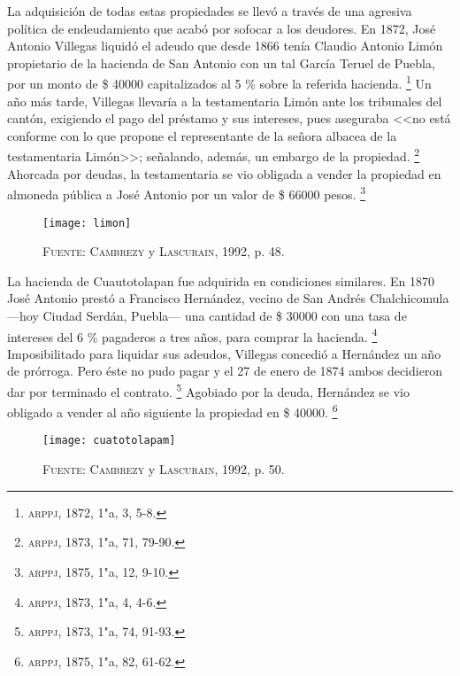 \documentclass[14pt,twoside,final]{extbook} %
\let\oldfootnote\footnote
\renewcommand\footnote[1]{%
\oldfootnote{\hspace{1mm}#1}}
\begin{document}
La adquisición de todas estas propiedades se llevó a través de una agresiva política de endeudamiento que acabó por sofocar a los deudores. En 1872, José Antonio Villegas liquidó el adeudo que desde 1866 tenía Claudio Antonio Limón propietario de la hacienda de San Antonio con un tal García Teruel de Puebla, por un monto de \$ 40000 capitalizados al 5 \% sobre la referida hacienda.\footnote{\textsc{arppj}, 1872, 1"a, 3, 5-8.} Un año más tarde, Villegas llevaría a la testamentaria Limón ante los tribunales del cantón, exigiendo el pago del préstamo y sus intereses, pues aseguraba <<no está conforme con lo que propone el representante de la señora albacea de la testamentaria Limón>>; señalando, además, un embargo de la propiedad.\footnote{\textsc{arppj}, 1873, 1"a, 71, 79-90.} Ahorcada por deudas, la testamentaria se vio obligada a vender la propiedad en almoneda pública a José Antonio por un valor de \$ 66000 pesos.\footnote{\textsc{arppj}, 1875, 1"a, 12, 9-10.}
\begin{sidewaysfigure}
\centering
\texttt{[image: limon]}
\caption[Plano de la hacienda de San Antonio Limón]{\textsc{Fuente:} \textsc{Cambrezy} y \textsc{Lascurain}, 1992, p. 48.}
\label{fig:hda-limon}
\end{sidewaysfigure}

La hacienda de Cuautotolapan fue adquirida en condiciones similares. En 1870 José Antonio prestó a Francisco Hernández, vecino de San Andrés Chalchicomula ---hoy Ciudad Serdán, Puebla--- una cantidad de \$ 30000 con una tasa de intereses del 6 \% pagaderos a tres años, para comprar la hacienda.\footnote{\textsc{arppj}, 1873, 1"a, 4, 4-6.} Imposibilitado para liquidar sus adeudos, Villegas concedió a Hernández un año de prórroga. Pero éste no pudo pagar y el 27 de enero de 1874 ambos decidieron dar por terminado el contrato.\footnote{\textsc{arppj}, 1873, 1"a, 74, 91-93.} Agobiado
por la deuda, Hernández se vio obligado a vender al año siguiente la propiedad en \$ 40000.\footnote{\textsc{arppj}, 1875, 1"a, 82, 61-62.}
\begin{sidewaysfigure}
\centering
\texttt{[image: cuatotolapam]}
\caption[Plano de la hacienda de Cuatotolapam]{\textsc{Fuente:} \textsc{Cambrezy} y \textsc{Lascurain}, 1992, p. 50.}
\label{fig:hda-cuatotolapam}
\end{sidewaysfigure}
\end{document}

